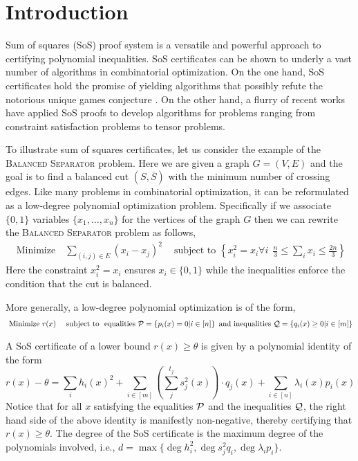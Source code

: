 \section{Introduction}
\label{sec:intro}

Sum of squares (SoS) proof system is a versatile and powerful approach to certifying polynomial inequalities. 
%
SoS certificates can be shown to underly a vast number of algorithms in combinatorial optimization. 
%
On the one hand, SoS certificates hold the promise of yielding algorithms that possibly refute the notorious unique games conjecture \cite{BBHKSZ12, barak2011rounding,GuruswamiS11}.  
%
On the other hand, a flurry of recent works have applied SoS proofs to develop algorithms for problems ranging from constraint satisfaction problems to tensor problems.  

To illustrate sum of squares certificates, let us consider the example of the
\textsc{Balanced Separator} problem.  Here we are given a graph $G = (V,E)$ and the goal is to find a balanced cut $(S,\overline{S})$ with the minimum number of crossing edges.
%
Like many problems in combinatorial optimization, it can be reformulated as a low-degree polynomial optimization problem.  
%
Specifically if we associate $\{0,1\}$ variables $\{x_1,\ldots,x_n\}$ for the vertices of the graph $G$ then we can rewrite the \textsc{Balanced Separator} problem as follows,
\begin{align*}
\text{ Minimize } \ \ \  \sum_{(i,j) \in E} (x_i-x_j)^2  \ \ \ \ \text{ subject to } \left\{ x_i^2 = x_i \forall i\ \ \frac{n}{3} \leq \sum_i x_i \leq \frac{2n}{3} \right\}
\end{align*} 
Here the constraint $x_i^2 = x_i$ ensures $x_i \in \{0,1\}$ while the inequalities enforce the condition that the cut is balanced.

More generally, a low-degree polynomial optimization is of the form,
\begin{align*}
\text{ Minimize } & r(x)   & \text{ subject to } \text{ equalities } \mathcal P = \left\{ p_i(x) = 0 | i \in [n] \right\} \text{ and inequalities } \mathcal Q = \left\{ q_i(x) \geq 0 | i \in [m] \right\}
\end{align*} 

A SoS certificate of a lower bound $ r(x) \geq \theta$ is given by a polynomial identity of the form
\[ r(x) - \theta  = \sum_{i} h_i(x)^2 + \sum_{i \in [m]} \left(\sum_{j}^{t_j} s_j^2(x) \right) \cdot q_j(x) + \sum_{i \in [n]} \lambda_i(x) p_i(x) \]
Notice that for all $x$ satisfying the equalities $\mathcal P$ and the inequalities $\mathcal Q$, the right hand side of the above identity is manifestly non-negative, thereby certifying that $r(x) \geq \theta$.  The degree of the SoS certificate is the maximum degree of the polynomials involved, i.e., $d = \max\{\deg h_i^2, \deg s_j^2 q_i, \deg \lambda_i p_i\}$.

